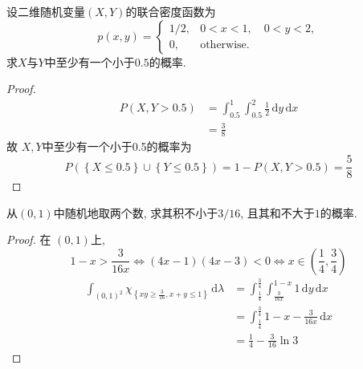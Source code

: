 \documentclass[../main.tex]{subfiles}
\begin{document}
\begin{exercise}{}{}
设二维随机变量$(X,Y)$的联合密度函数为
\[
p(x,y) = \begin{cases}
1/2, & 0 < x < 1, \quad 0 < y < 2, \\
0, & \text{otherwise}.
\end{cases}
\]
求$X$与$Y$中至少有一个小于$0.5$的概率.
\end{exercise}
\begin{proof}
  \[
  \begin{aligned}
  P\left( X, Y>  0.5 \right)&= \int_{0.5}^{1} \int_{0.5}^{2}\frac{1 }{2 }\,\mathrm{d} y\,\mathrm{d} x\\ 
   &=   \frac{3 }{8 } 
  \end{aligned} 
  \]故 \(  X,Y  \)中至少有一个小于0.5的概率为 \[
  P\left( \left\{ X\le 0.5 \right\}\cup \left\{ Y\le 0.5 \right\} \right)= 1-P\left( X,Y> 0.5 \right)= \frac{5 }{8 }   
  \] 
\end{proof}
\begin{exercise}{}{}
从$(0,1)$中随机地取两个数, 求其积不小于$3/16$, 且其和不大于$1$的概率.
\end{exercise}
\begin{proof}
  在 \(  \left( 0,1 \right)   \)上,  \[
  1-x>  \frac{3 }{16x }\iff   \left( 4x-1\right)\left( 4x-3 \right)  <  0\iff x\in \left( \frac{1 }{4 }, \frac{3 }{4 }   \right) 
  \] \[
  \begin{aligned}
  \int _{\left( 0,1 \right)^{2} } \chi _{\left\{ xy\ge \frac{3 }{16 }, x+ y\le 1  \right\}}\,\mathrm{d}  \lambda  &=   \int_{\frac{1 }{4 } }^{\frac{3 }{4 } } \int_{\frac{3 }{16x } }^{1-x}1 \,\mathrm{d} y\,\mathrm{d} x\\ 
   &=  \int_{\frac{1 }{4 } }^{\frac{3 }{4 } }1-x-\frac{3 }{16x }\,\mathrm{d} x\\ 
    &= \frac{1 }{4 } -\frac{3 }{16 } \ln 3     
  \end{aligned}
  \] 
\end{proof}
\end{document}
